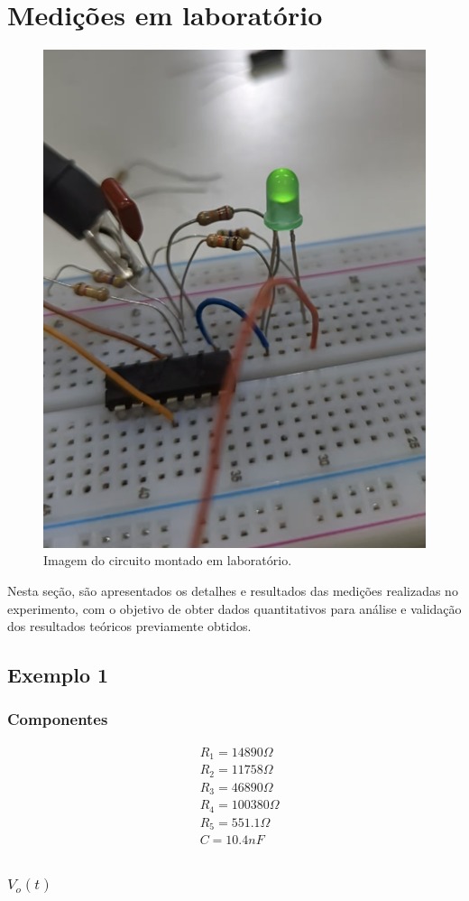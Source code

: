 \newpage

\section{Medições em laboratório}

\begin{figure}[h]
    \centering
    \includegraphics[width=0.3\columnwidth]{images/circuito_montado.png}
    \caption{Imagem do circuito montado em laboratório.}
\end{figure}

Nesta seção, são apresentados os detalhes e resultados das medições realizadas no experimento, com o objetivo de obter dados quantitativos para análise e validação dos resultados teóricos previamente obtidos.

\subsection{Exemplo 1}

\subsubsection{Componentes}

\begin{equation}
    \begin{aligned}
         & R_1 = 14890 \varOmega  \\
         & R_2 = 11758 \varOmega  \\
         & R_3 = 46890 \varOmega  \\
         & R_4 = 100380 \varOmega \\
         & R_5 = 551.1 \varOmega  \\
         & C = 10.4nF             \\
    \end{aligned}
\end{equation}


\subsubsection{$V_o (t)$}

